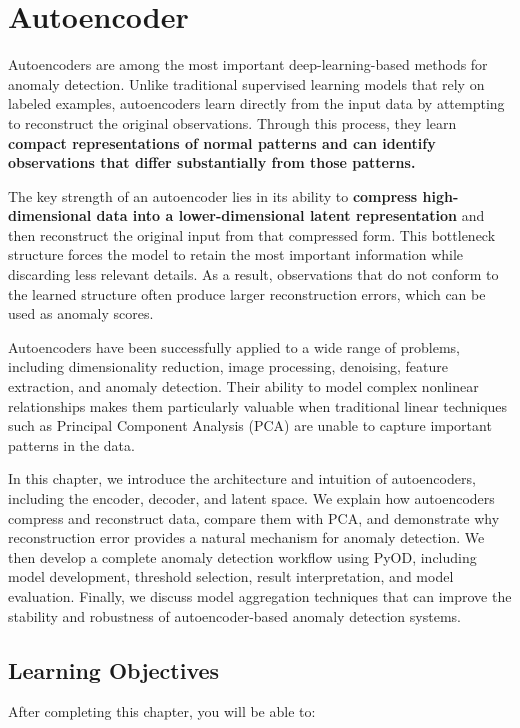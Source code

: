 \chapter{Autoencoder}
\label{ch14}

Autoencoders are among the most important deep-learning-based methods for anomaly detection. Unlike traditional supervised learning models that rely on labeled examples, autoencoders learn directly from the input data by attempting to reconstruct the original observations. Through this process, they learn \textbf{compact representations of normal patterns and can identify observations that differ substantially from those patterns.}

The key strength of an autoencoder lies in its ability to \textbf{compress high-dimensional data into a lower-dimensional latent representation} and then reconstruct the original input from that compressed form. This bottleneck structure forces the model to retain the most important information while discarding less relevant details. As a result, observations that do not conform to the learned structure often produce larger reconstruction errors, which can be used as anomaly scores.

Autoencoders have been successfully applied to a wide range of problems, including dimensionality reduction, image processing, denoising, feature extraction, and anomaly detection. Their ability to model complex nonlinear relationships makes them particularly valuable when traditional linear techniques such as Principal Component Analysis (PCA) are unable to capture important patterns in the data.

In this chapter, we introduce the architecture and intuition of autoencoders, including the encoder, decoder, and latent space. We explain how autoencoders compress and reconstruct data, compare them with PCA, and demonstrate why reconstruction error provides a natural mechanism for anomaly detection. We then develop a complete anomaly detection workflow using PyOD, including model development, threshold selection, result interpretation, and model evaluation. Finally, we discuss model aggregation techniques that can improve the stability and robustness of autoencoder-based anomaly detection systems.

\section{Learning Objectives}

After completing this chapter, you will be able to:

